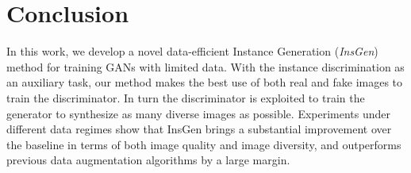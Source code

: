 \documentclass{article}
\begin{document}
\section{Conclusion}\label{sec:conclusion}


In this work, we develop a novel data-efficient Instance Generation (\textit{InsGen}) method for training GANs with limited data.
With the instance discrimination as an auxiliary task, our method makes the best use of both real and fake images to train the discriminator.
In turn the discriminator is exploited to train the generator to synthesize as many diverse images as possible.
Experiments under different data regimes show that InsGen brings a substantial improvement over the baseline in terms of both image quality and image diversity, and outperforms previous data augmentation algorithms by a large margin.


{\small


}
\end{document}
